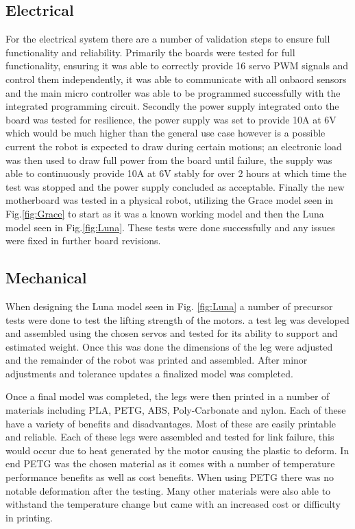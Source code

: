 \documentclass[12pt]{report}
\begin{document}
    \subsection{Electrical}
        For the electrical system there are a number of validation steps to ensure full functionality and reliability. Primarily the boards were tested for full functionality, ensuring it was able to correctly provide 16 servo PWM signals and control them independently, it was able to communicate with all onbaord sensors and the main micro controller was able to be programmed successfully with the integrated programming circuit. Secondly the power supply integrated onto the board was tested for resilience, the power supply was set to provide 10A at 6V which would be much higher than the general use case however is a possible current the robot is expected to draw during certain motions; an electronic load was then used to draw full power from the board until failure, the supply was able to continuously provide 10A at 6V stably for over 2 hours at which time the test was stopped and the power supply concluded as acceptable. Finally the new motherboard was tested in a physical robot, utilizing the Grace model seen in Fig.\ref{fig:Grace} to start as it was a known working model and then the Luna model seen in Fig.\ref{fig:Luna}. These tests were done successfully and any issues were fixed in further board revisions.
    \subsection{Mechanical}
        When designing the Luna model seen in Fig. \ref{fig:Luna} a number of precursor tests were done to test the lifting strength of the motors. a test leg was developed and assembled using the chosen servos and tested for its ability to support and estimated weight. Once this was done the dimensions of the leg were adjusted and the remainder of the robot was printed and assembled. After minor adjustments and tolerance updates a finalized model was completed. 
        
        Once a final model was completed, the legs were then printed in a number of materials including PLA, PETG, ABS, Poly-Carbonate and nylon. Each of these have a variety of benefits and disadvantages. Most of these are easily printable and reliable. Each of these legs were assembled and tested for link failure, this would occur due to heat generated by the motor causing the plastic to deform. In end PETG was the chosen material as it comes with a number of temperature performance benefits as well as cost benefits. When using PETG there was no notable deformation after the testing. Many other materials were also able to withstand the temperature change but came with an increased cost or difficulty in printing. 
        
\end{document}
